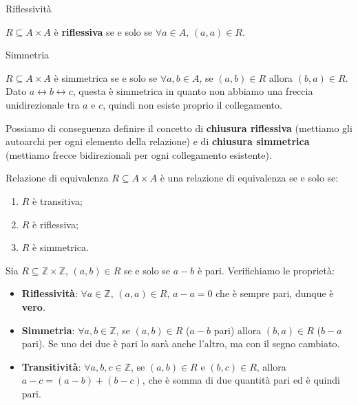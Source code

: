 \documentclass[12pt]{report}
\begin{document}
	\begin{definizione}{Riflessività}{}
		
		$R \subseteq A \times A$ è \textbf{riflessiva} se e solo se $\forall a \in A, \, (a, a) \in R$.
		
	\end{definizione}
	
	\begin{definizione}{Simmetria}{}
		
		$R \subseteq A \times A$ è simmetrica se e solo se $\forall a, b \in A$, se $(a, b) \in R$ allora $(b, a) \in R$.
		Dato $a \longleftrightarrow b \longleftrightarrow c$, questa è simmetrica in quanto non abbiamo una freccia unidirezionale tra $a$ e $c$, quindi non esiste proprio il collegamento.
		
	\end{definizione}
	
	Possiamo di conseguenza definire il concetto di \textbf{chiusura riflessiva} (mettiamo gli autoarchi per ogni elemento della relazione) e di \textbf{chiusura simmetrica} (mettiamo frecce bidirezionali per ogni collegamento esistente).
	
	\begin{definizione}{Relazione di equivalenza}{}
		$R \subseteq A \times A$ è una relazione di equivalenza se e solo se:
		\begin{enumerate}
			\item $R$ è transitiva;
			\item $R$ è riflessiva;
			\item $R$ è simmetrica.
		\end{enumerate}
	\end{definizione}
	
	\begin{osservazione}{}{}
		Sia $R \subseteq \mathbb{Z} \times \mathbb{Z}$, $(a, b) \in R$ se e solo se $a - b$ è pari. Verifichiamo le proprietà:
		\begin{itemize}
			\item \textbf{Riflessività}: $\forall a \in \mathbb{Z}, \, (a, a) \in R$, $a - a = 0$ che è sempre pari, dunque è \textbf{vero}.
			\item \textbf{Simmetria}: $\forall a, b \in \mathbb{Z}$, se $(a, b) \in R$ ($a - b$ pari) allora $(b, a) \in R$ ($b - a$ pari). Se uno dei due è pari lo sarà anche l'altro, ma con il segno cambiato.
			\item \textbf{Transitività}: $\forall a, b, c \in \mathbb{Z}$, se $(a, b) \in R$ e $(b, c) \in R$, allora $a - c = (a - b) + (b - c)$, che è somma di due quantità pari ed è quindi pari.
		\end{itemize}
	\end{osservazione}
	
\end{document}
